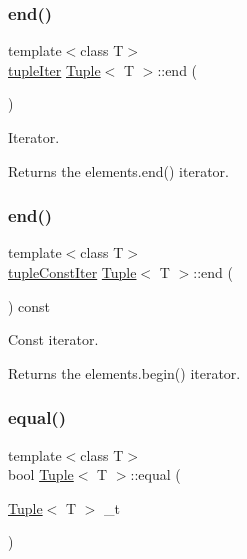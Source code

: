 \subsubsection{\texorpdfstring{end()}{end()}\hspace{0.1cm}{\footnotesize\ttfamily [1/2]}}
{\footnotesize\ttfamily template$<$class T$>$ \\
\mbox{\hyperlink{maths_8hh_ad22dcdeefda7d41523cc1604953eb6cc}{tuple\+Iter}} \mbox{\hyperlink{class_tuple}{Tuple}}$<$ T $>$\+::end (\begin{DoxyParamCaption}{ }\end{DoxyParamCaption})\hspace{0.3cm}{\ttfamily [inline]}}



Iterator. 

\begin{DoxyReturn}{Returns}
the elements.\+end() iterator. 
\end{DoxyReturn}
\mbox{\label{class_tuple_ac55a72437773f17dd8fbccf866d7e7eb}} 
\subsubsection{\texorpdfstring{end()}{end()}\hspace{0.1cm}{\footnotesize\ttfamily [2/2]}}
{\footnotesize\ttfamily template$<$class T$>$ \\
\mbox{\hyperlink{maths_8hh_a2eba794860251c1b30e532df32ee4d1b}{tuple\+Const\+Iter}} \mbox{\hyperlink{class_tuple}{Tuple}}$<$ T $>$\+::end (\begin{DoxyParamCaption}{ }\end{DoxyParamCaption}) const\hspace{0.3cm}{\ttfamily [inline]}}



Const iterator. 

\begin{DoxyReturn}{Returns}
the elements.\+begin() iterator. 
\end{DoxyReturn}
\mbox{\label{class_tuple_a68d1d3aaecc187f8f78b46f4e1b48260}} 
\subsubsection{\texorpdfstring{equal()}{equal()}}
{\footnotesize\ttfamily template$<$class T$>$ \\
bool \mbox{\hyperlink{class_tuple}{Tuple}}$<$ T $>$\+::equal (\begin{DoxyParamCaption}\item[{\mbox{\hyperlink{class_tuple}{Tuple}}$<$ T $>$}]{\+\_\+t }\end{DoxyParamCaption})\hspace{0.3cm}{\ttfamily [inline]}}



